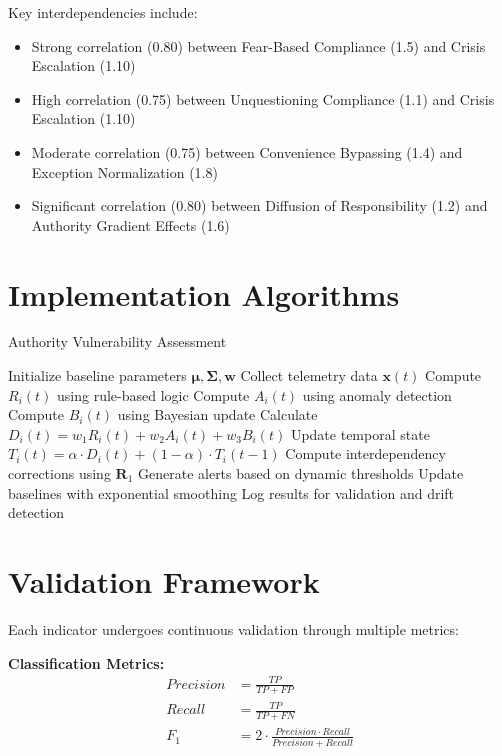 \documentclass[11pt,a4paper]{article}
\begin{document}
Key interdependencies include:
\begin{itemize}
\item Strong correlation (0.80) between Fear-Based Compliance (1.5) and Crisis Escalation (1.10)
\item High correlation (0.75) between Unquestioning Compliance (1.1) and Crisis Escalation (1.10)
\item Moderate correlation (0.75) between Convenience Bypassing (1.4) and Exception Normalization (1.8)
\item Significant correlation (0.80) between Diffusion of Responsibility (1.2) and Authority Gradient Effects (1.6)
\end{itemize}

\section{Implementation Algorithms}

\begin{algorithm}
\caption{Authority Vulnerability Assessment}
\begin{algorithmic}[1]
\STATE Initialize baseline parameters $\boldsymbol{\mu}, \boldsymbol{\Sigma}, \boldsymbol{w}$
    \STATE Collect telemetry data $\mathbf{x}(t)$
        \STATE Compute $R_i(t)$ using rule-based logic
        \STATE Compute $A_i(t)$ using anomaly detection
        \STATE Compute $B_i(t)$ using Bayesian update
        \STATE Calculate $D_i(t) = w_1 R_i(t) + w_2 A_i(t) + w_3 B_i(t)$
        \STATE Update temporal state $T_i(t) = \alpha \cdot D_i(t) + (1-\alpha) \cdot T_i(t-1)$
    \ENDFOR
    \STATE Compute interdependency corrections using $\mathbf{R}_1$
    \STATE Generate alerts based on dynamic thresholds
    \STATE Update baselines with exponential smoothing
    \STATE Log results for validation and drift detection
\ENDFOR
\end{algorithmic}
\end{algorithm}

\section{Validation Framework}

Each indicator undergoes continuous validation through multiple metrics:

\textbf{Classification Metrics:}
\begin{align}
Precision &= \frac{TP}{TP + FP} \\
Recall &= \frac{TP}{TP + FN} \\
F_1 &= 2 \cdot \frac{Precision \cdot Recall}{Precision + Recall}
\end{align}
\end{document}
